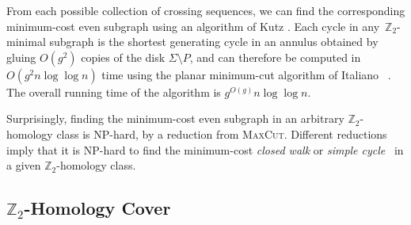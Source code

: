 \documentclass[natbib]{svcyclop}
\def\Z{\mathbb{Z}}
\begin{document}
From each possible collection of crossing sequences, we can find the corresponding minimum-cost even subgraph using an algorithm of Kutz \cite{k-csnco-06}.
Each cycle in any~$\Z_2$-minimal subgraph is the shortest generating cycle in an annulus obtained by gluing $O(g^2)$ copies of the disk $\Sigma\setminus P$, and can therefore be computed in $O(g^2n\log\log n)$ time using the planar minimum-cut algorithm of Italiano \etal~\cite{insw-iamcmf-11}.
The overall running time of the algorithm is $g^{O(g)}n\log\log n$.

Surprisingly, finding the minimum-cost even subgraph in an arbitrary $\Z_2$-homology class is NP-hard, by a reduction from \textsc{MaxCut}.  Different reductions imply that it is NP-hard to find the minimum-cost \emph{closed walk} \cite{ccelw-scsih-08} or \emph{simple cycle}~\cite{c-fscss-10} in a given $\Z_2$-homology class.

\subsection{$\Z_2$-Homology Cover}
\end{document}
